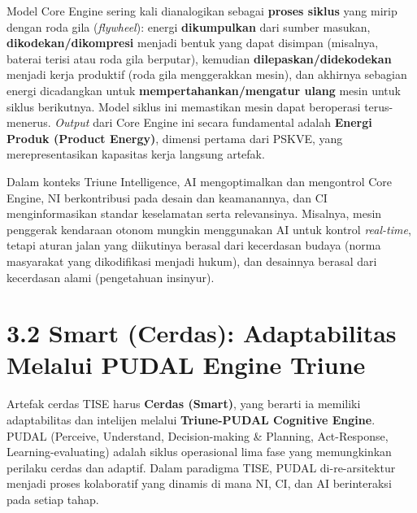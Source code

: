 \documentclass[
  letterpaper,
  DIV=11,
  numbers=noendperiod]{scrreprt}
\begin{document}
Model Core Engine sering kali dianalogikan sebagai \textbf{proses
siklus} yang mirip dengan roda gila (\emph{flywheel}): energi
\textbf{dikumpulkan} dari sumber masukan, \textbf{dikodekan/dikompresi}
menjadi bentuk yang dapat disimpan (misalnya, baterai terisi atau roda
gila berputar), kemudian \textbf{dilepaskan/didekodekan} menjadi kerja
produktif (roda gila menggerakkan mesin), dan akhirnya sebagian energi
dicadangkan untuk \textbf{mempertahankan/mengatur ulang} mesin untuk
siklus berikutnya. Model siklus ini memastikan mesin dapat beroperasi
terus-menerus. \emph{Output} dari Core Engine ini secara fundamental
adalah \textbf{Energi Produk (Product Energy)}, dimensi pertama dari
PSKVE, yang merepresentasikan kapasitas kerja langsung artefak.

Dalam konteks Triune Intelligence, AI mengoptimalkan dan mengontrol Core
Engine, NI berkontribusi pada desain dan keamanannya, dan CI
menginformasikan standar keselamatan serta relevansinya. Misalnya, mesin
penggerak kendaraan otonom mungkin menggunakan AI untuk kontrol
\emph{real-time}, tetapi aturan jalan yang diikutinya berasal dari
kecerdasan budaya (norma masyarakat yang dikodifikasi menjadi hukum),
dan desainnya berasal dari kecerdasan alami (pengetahuan insinyur).

\section{\texorpdfstring{\textbf{3.2 Smart (Cerdas): Adaptabilitas
Melalui PUDAL Engine
Triune}}{3.2 Smart (Cerdas): Adaptabilitas Melalui PUDAL Engine Triune}}\label{smart-cerdas-adaptabilitas-melalui-pudal-engine-triune}

Artefak cerdas TISE harus \textbf{Cerdas (Smart)}, yang berarti ia
memiliki adaptabilitas dan intelijen melalui \textbf{Triune-PUDAL
Cognitive Engine}. PUDAL (Perceive, Understand, Decision-making \&
Planning, Act-Response, Learning-evaluating) adalah siklus operasional
lima fase yang memungkinkan perilaku cerdas dan adaptif. Dalam paradigma
TISE, PUDAL di-re-arsitektur menjadi proses kolaboratif yang dinamis di
mana NI, CI, dan AI berinteraksi pada setiap tahap.
\end{document}
